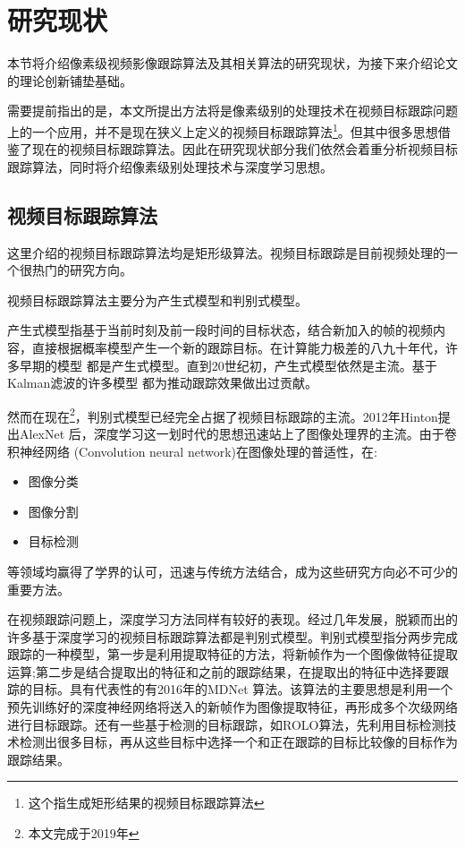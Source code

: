 
\newpage
\section{研究现状}
本节将介绍像素级视频影像跟踪算法及其相关算法的研究现状，为接下来介绍论文的理论创新铺垫基础。
\par
需要提前指出的是，本文所提出方法将是像素级别的处理技术在视频目标跟踪问题上的一个应用，并不是现在狭义上定义的视频目标跟踪算法\footnote{这个指生成矩形结果的视频目标跟踪算法}。但其中很多思想借鉴了现在的视频目标跟踪算法。因此在研究现状部分我们依然会着重分析视频目标跟踪算法，同时将介绍像素级别处理技术与深度学习思想。

\subsection{视频目标跟踪算法}
这里介绍的视频目标跟踪算法均是矩形级算法。视频目标跟踪是目前视频处理的一个很热门的研究方向。
\par
视频目标跟踪算法主要分为产生式模型和判别式模型。
\par
产生式模型指基于当前时刻及前一段时间的目标状态，结合新加入的帧的视频内容，直接根据概率模型产生一个新的跟踪目标。在计算能力极差的八九十年代，许多早期的模型
\supercite{schalkoff1982model}
都是产生式模型。直到20世纪初，产生式模型依然是主流。基于Kalman滤波的许多模型
\supercite{kim2002fast, weng2006video, comaniciu2003kernel}
都为推动跟踪效果做出过贡献。
\par
然而在现在\footnote{本文完成于2019年}，判别式模型已经完全占据了视频目标跟踪的主流。2012年Hinton提出AlexNet 
\supercite{krizhevsky2012imagenet} 
后，深度学习这一划时代的思想迅速站上了图像处理界的主流。由于卷积神经网络
\supercite{krizhevsky2012imagenet} 
(Convolution neural network)在图像处理的普适性，在:
\begin{itemize}
    \item 图像分类\supercite{krizhevsky2012imagenet, witten2016data, he2016deep}
    \item 图像分割\supercite{long2015fully}
    \item 目标检测\supercite{ren2015faster, redmon2016you}
\end{itemize}
等领域均赢得了学界的认可，迅速与传统方法结合，成为这些研究方向必不可少的重要方法。
\par
在视频跟踪问题上，深度学习方法同样有较好的表现。经过几年发展，脱颖而出的许多基于深度学习的视频目标跟踪算法都是判别式模型。判别式模型指分两步完成跟踪的一种模型，第一步是利用提取特征的方法，将新帧作为一个图像做特征提取运算;第二步是结合提取出的特征和之前的跟踪结果，在提取出的特征中选择要跟踪的目标。具有代表性的有2016年的MDNet \supercite{nam2016mdnet}算法。该算法的主要思想是利用一个预先训练好的深度神经网络将送入的新帧作为图像提取特征，再形成多个次级网络进行目标跟踪。还有一些基于检测的目标跟踪，如ROLO\supercite{ning2016spatially}算法，先利用目标检测技术检测出很多目标，再从这些目标中选择一个和正在跟踪的目标比较像的目标作为跟踪结果。
